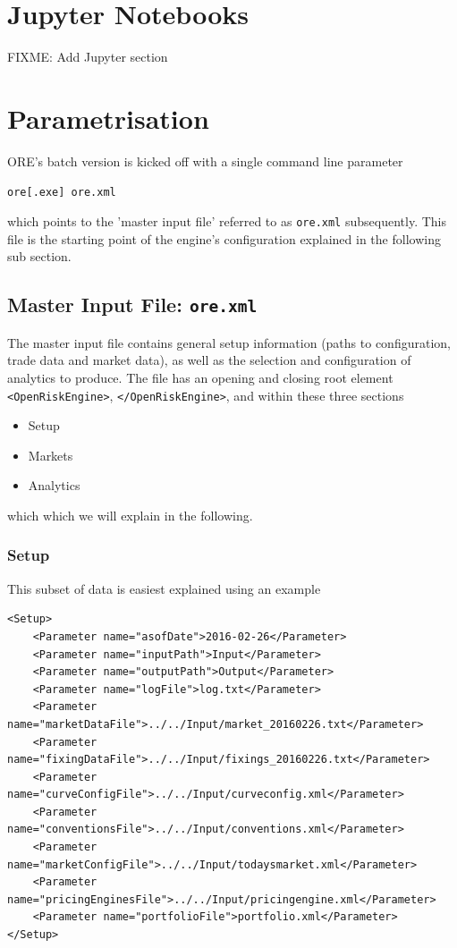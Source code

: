 \documentclass[12pt, a4paper]{article}
\begin{document}
\section{Jupyter Notebooks}

FIXME: Add Jupyter section

\section{Parametrisation}\label{sec:configuration}

ORE's batch version is kicked off with a single command line parameter 

\medskip
\centerline{\tt ore[.exe] ore.xml}
\medskip

which points to the 'master input file' referred to  
as {\tt ore.xml} subsequently. 
This file is the starting point of the engine's configuration explained in the following sub section.

\subsection{Master Input File: {\tt ore.xml}}

The master input file contains general setup information (paths to configuration, trade data and market data), as well as the selection and configuration of  analytics to produce. The file has an opening and closing root element {\tt <OpenRiskEngine>}, {\tt </OpenRiskEngine>}, and within these three sections 
\begin{itemize}
\item Setup
\item Markets
\item Analytics
\end{itemize}
which which we will explain in the following.

\subsubsection*{Setup}

This subset of data is easiest explained using an example
{\footnotesize
\begin{lstlisting}[caption={ORE setup example},
 	label=lst:ore_setup]
<Setup>    
	<Parameter name="asofDate">2016-02-26</Parameter>
	<Parameter name="inputPath">Input</Parameter>
	<Parameter name="outputPath">Output</Parameter>
	<Parameter name="logFile">log.txt</Parameter>
	<Parameter name="marketDataFile">../../Input/market_20160226.txt</Parameter>
	<Parameter name="fixingDataFile">../../Input/fixings_20160226.txt</Parameter>
	<Parameter name="curveConfigFile">../../Input/curveconfig.xml</Parameter>
	<Parameter name="conventionsFile">../../Input/conventions.xml</Parameter>
	<Parameter name="marketConfigFile">../../Input/todaysmarket.xml</Parameter>
	<Parameter name="pricingEnginesFile">../../Input/pricingengine.xml</Parameter>
	<Parameter name="portfolioFile">portfolio.xml</Parameter>
</Setup>
\end{lstlisting}
}
\end{document}
